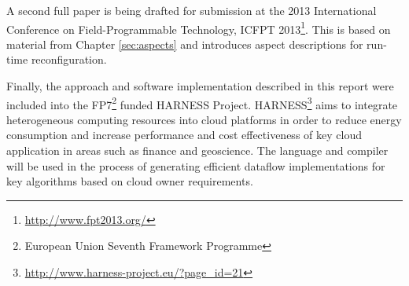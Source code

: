 A second full paper is being drafted for submission at the 2013
International Conference on Field-Programmable Technology, ICFPT
2013\footnote{\url{http://www.fpt2013.org/}}. This is based on material
from Chapter \ref{sec:aspects} and introduces aspect descriptions for
run-time reconfiguration.

Finally, the approach and software implementation described in this
report were included into the FP7\footnote{European Union Seventh
  Framework Programme} funded HARNESS Project.
HARNESS\footnote{\url{http://www.harness-project.eu/?page_id=21}} aims
to integrate heterogeneous computing resources into cloud platforms in
order to reduce energy consumption and increase performance and cost
effectiveness of key cloud application in areas such as finance and
geoscience. The \FAST{} language and \fastc{} compiler will be used in
the process of generating efficient dataflow implementations for key
algorithms based on cloud owner requirements.
